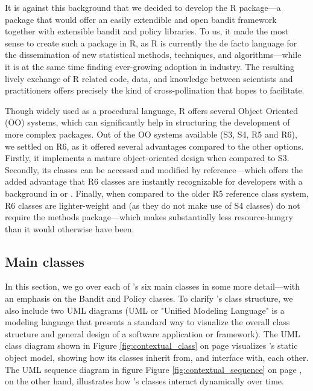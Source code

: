 \documentclass{jss}\usepackage[]{graphicx}\usepackage[]{color}
\begin{document}
It is against this background that we decided to develop the  R package---a package that would offer an easily extendible and open bandit framework together with extensible bandit and policy libraries. To us, it made the most sense to create such a package in R, as R is currently the de facto language for the dissemination of new statistical methods, techniques, and algorithms---while it is at the same time finding ever-growing adoption in industry. The resulting lively exchange of R related code, data, and knowledge between scientists and practitioners offers precisely the kind of cross-pollination that  hopes to facilitate.

Though widely used as a procedural language, R offers several Object Oriented (OO) systems, which can significantly help in structuring the development of more complex packages. Out of the OO systems available (S3, S4, R5 and R6), we settled on R6, as it offered several advantages compared to the other options. Firstly, it implements a mature object-oriented design when compared to S3. Secondly, its classes can be accessed and modified by reference---which offers the added advantage that R6 classes are instantly recognizable for developers with a background in  or . Finally, when compared to the older R5 reference class system, R6 classes are lighter-weight and (as they do not make use of S4 classes) do not require the methods package---which makes  substantially less resource-hungry than it would otherwise have been.

\subsection{Main classes}

In this section, we go over each of 's six main classes in some more detail---with an emphasis on the Bandit and Policy classes. To clarify 's class structure, we also include two UML diagrams (UML or "Unified Modeling Language" is a modeling language that presents a standard way to visualize the overall class structure and general design of a software application or framework). The UML class diagram shown in Figure \ref{fig:contextual_class} on page \pageref{fig:contextual_class} visualizes 's static object model, showing how its classes inherit from, and interface with, each other. The UML sequence diagram in figure Figure \ref{fig:contextual_sequence} on page \pageref{fig:contextual_sequence}, on the other hand, illustrates how 's classes interact dynamically over time.
\end{document}
